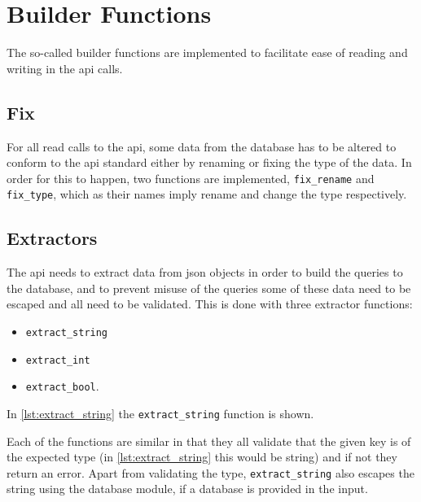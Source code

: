 \section{Builder Functions}
The so-called builder functions are implemented to facilitate ease of reading and writing in the \ac{api} calls.

\subsection{Fix}
For all read calls to the \ac{api}, some data from the database has to be altered to conform to the \ac{api} standard either by renaming or fixing the type of the data. In order for this to happen, two functions are implemented,  \lstinline|fix_rename| and  \lstinline|fix_type|, which as their names imply rename and change the type respectively. 

\subsection{Extractors}
The \ac{api} needs to extract data from \ac{json} objects in order to build the queries to the database, and to prevent misuse of the queries some of these data need to be escaped and all need to be validated. This is done with three extractor functions: 
\begin{itemize}
\item \lstinline|extract_string| 
\item \lstinline|extract_int| 
\item \lstinline|extract_bool|. 
\end{itemize}
In \autoref{lst:extract_string} the \lstinline|extract_string| function is shown.



Each of the functions are similar in that they all validate that the given key is of the expected type (in \autoref{lst:extract_string} this would be string) and if not they return an error. Apart from validating the type, \lstinline|extract_string| also escapes the string using the database module, if a database is provided in the input.

